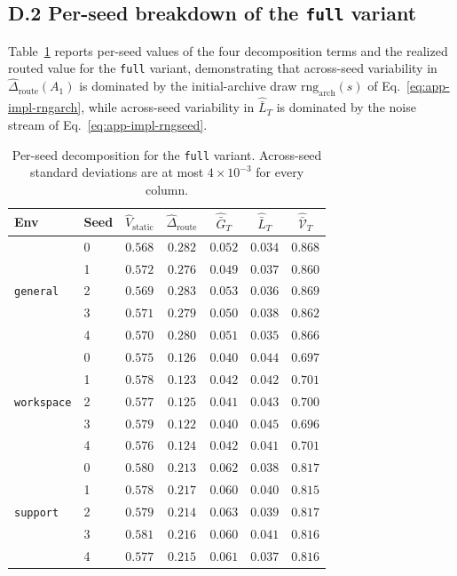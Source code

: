 \documentclass{article} %
\begin{document}
\subsection{D.2 Per-seed breakdown of the \texttt{full} variant}

\label{app:tab-perseed}

Table~\ref{tab:app-perseed} reports per-seed values of the four decomposition terms and the realized routed value for the \texttt{full} variant, demonstrating that across-seed variability in $\widehat\Delta_{\mathrm{route}}(A_1)$ is dominated by the initial-archive draw \(\mathrm{rng}_{\mathrm{arch}}(s)\) of Eq.~\eqref{eq:app-impl-rngarch}, while across-seed variability in $\widehat{\bar L}_T$ is dominated by the noise stream of Eq.~\eqref{eq:app-impl-rngseed}.

\begin{table}[h]
\centering
\small
\setlength{\tabcolsep}{4pt}
\begin{tabular}{llccccc}
\toprule
Env & Seed & $\widehat V_{\mathrm{static}}$ & $\widehat\Delta_{\mathrm{route}}$ & $\widehat{\bar G}_T$ & $\widehat{\bar L}_T$ & $\widehat{\bar{\mathcal V}}_T$ \\
\midrule
\multirow{5}{*}{\texttt{general}}
 & 0 & $0.568$ & $0.282$ & $0.052$ & $0.034$ & $0.868$ \\
 & 1 & $0.572$ & $0.276$ & $0.049$ & $0.037$ & $0.860$ \\
 & 2 & $0.569$ & $0.283$ & $0.053$ & $0.036$ & $0.869$ \\
 & 3 & $0.571$ & $0.279$ & $0.050$ & $0.038$ & $0.862$ \\
 & 4 & $0.570$ & $0.280$ & $0.051$ & $0.035$ & $0.866$ \\
\midrule
\multirow{5}{*}{\texttt{workspace}}
 & 0 & $0.575$ & $0.126$ & $0.040$ & $0.044$ & $0.697$ \\
 & 1 & $0.578$ & $0.123$ & $0.042$ & $0.042$ & $0.701$ \\
 & 2 & $0.577$ & $0.125$ & $0.041$ & $0.043$ & $0.700$ \\
 & 3 & $0.579$ & $0.122$ & $0.040$ & $0.045$ & $0.696$ \\
 & 4 & $0.576$ & $0.124$ & $0.042$ & $0.041$ & $0.701$ \\
\midrule
\multirow{5}{*}{\texttt{support}}
 & 0 & $0.580$ & $0.213$ & $0.062$ & $0.038$ & $0.817$ \\
 & 1 & $0.578$ & $0.217$ & $0.060$ & $0.040$ & $0.815$ \\
 & 2 & $0.579$ & $0.214$ & $0.063$ & $0.039$ & $0.817$ \\
 & 3 & $0.581$ & $0.216$ & $0.060$ & $0.041$ & $0.816$ \\
 & 4 & $0.577$ & $0.215$ & $0.061$ & $0.037$ & $0.816$ \\
\bottomrule
\end{tabular}
\caption{Per-seed decomposition for the \texttt{full} variant. Across-seed standard deviations are at most $4\times 10^{-3}$ for every column.}
\label{tab:app-perseed}
\end{table}
\end{document}
